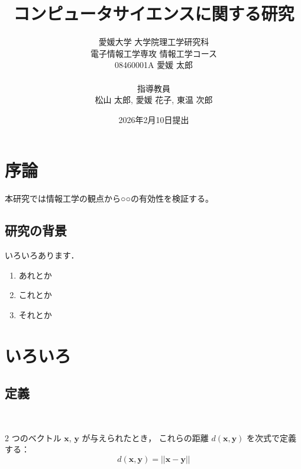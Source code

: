 \documentclass{thesis}
\begin{document}
\title{{\bf コンピュータサイエンスに関する研究}}
\author{愛媛大学 大学院理工学研究科\\
電子情報工学専攻 情報工学コース\\
08460001A  愛媛 太郎\\
\ \vspace{0.5cm} \\
指導教員\\
松山 太郎, 愛媛 花子, 東温 次郎}
\date{2026年2月10日提出}
\maketitle

\tableofcontents

\chapter{序論}

本研究では情報工学の観点から○○の有効性を検証する。

\section{研究の背景}

いろいろあります\cite{ソフトウェア工学の基礎知識,ファジィ学会誌-解説,Fenton_and_Kaposi_1987}．

\begin{enumerate}[(1)]
\item あれとか
\item これとか
\item それとか
\end{enumerate}

\chapter{いろいろ}

\section{定義}

\begin{definition}[距離] \label{def:距離} ~

\begin{rm}
$2$ つのベクトル $\boldsymbol{x}$, $\boldsymbol{y}$ が与えられたとき，
これらの距離 $d(\boldsymbol{x},\boldsymbol{y})$ を次式で定義する：
%
\begin{equation}\label{eqn:距離}
	d(\boldsymbol{x},\boldsymbol{y}) = %
	|| \boldsymbol{x} - \boldsymbol{y} ||
\end{equation}
\end{rm}
%
\QED
\end{definition}
\end{document}
